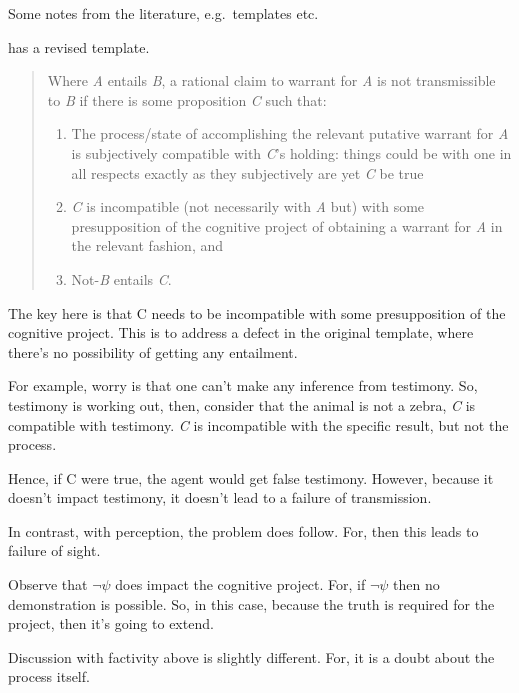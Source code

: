 \documentclass[10pt]{article}
\newcommand{\hozlinedash}[0]{%
  \noindent\hdashrule[0.5ex][c]{\textwidth}{.1pt}{2.5pt}
}
\begin{document}
\begin{note}[Literature]
  Some notes from the literature, e.g.\ templates etc.\

  \cite{Wright:2008wn} has a revised template.

  \begin{quote}
    Where \emph{A} entails \emph{B}, a rational claim to warrant for \emph{A} is not transmissible to \emph{B} if there is some proposition \emph{C} such that:

    \begin{enumerate}[label=\roman*)]
    \item The process/state of accomplishing the relevant putative warrant for \emph{A} is subjectively compatible with \emph{C}'s holding: things could be with one in all respects exactly as they subjectively are yet \emph{C} be true
    \item \emph{C} is incompatible (not necessarily with \emph{A} but) with some presupposition of the cognitive project of obtaining a warrant for \emph{A} in the relevant fashion, and
    \item Not-\emph{B} entails \emph{C}.
    \end{enumerate}
  \end{quote}
  The key here is that C needs to be incompatible with some presupposition of the cognitive project.
  This is to address a defect in the original template, where there's no possibility of getting any entailment.

  For example, worry is that one can't make any inference from testimony.
  So, testimony is working out, then, consider that the animal is not a zebra, \emph{C} is compatible with testimony.
  \emph{C} is incompatible with the specific result, but not the process.

  Hence, if C were true, the agent would get false testimony.
  However, because it doesn't impact testimony, it doesn't lead to a failure of transmission.

  In contrast, with perception, the problem does follow.
  For, then this leads to failure of sight.

  Observe that \(\lnot\psi\) does impact the cognitive project.
  For, if \(\lnot\psi\) then no demonstration is possible.
  So, in this case, because the truth is required for the project, then it's going to extend.

  \hozlinedash

  Discussion with factivity above is slightly different.
  For, it is a doubt about the process itself.


\end{note}
\end{document}
